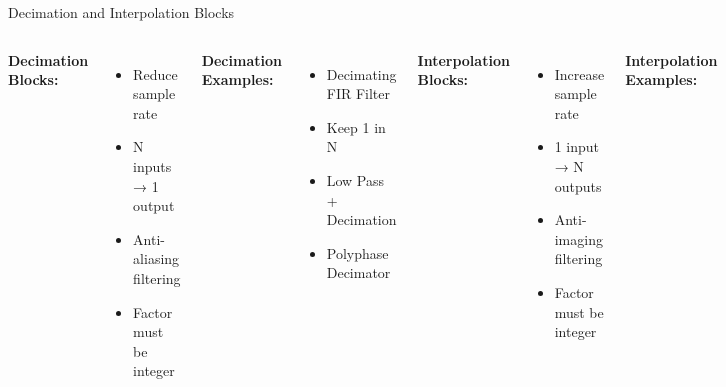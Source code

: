 \documentclass[aspectratio=169,11pt]{beamer}
\begin{document}
\begin{frame}{Decimation and Interpolation Blocks}
\begin{columns}
\textbf{Decimation Blocks:}
\begin{itemize}
    \item Reduce sample rate
    \item N inputs → 1 output
    \item Anti-aliasing filtering
    \item Factor must be integer
\end{itemize}

\textbf{Decimation Examples:}
\begin{itemize}
    \item Decimating FIR Filter
    \item Keep 1 in N
    \item Low Pass + Decimation
    \item Polyphase Decimator
\end{itemize}

\textbf{Interpolation Blocks:}
\begin{itemize}
    \item Increase sample rate
    \item 1 input → N outputs
    \item Anti-imaging filtering
    \item Factor must be integer
\end{itemize}

\textbf{Interpolation Examples:}
\begin{itemize}
    \item Interpolating FIR Filter
    \item Repeat
    \item Low Pass + Interpolation
    \item Polyphase Interpolator
\end{itemize}
\end{columns}
\end{frame}
\end{document}
